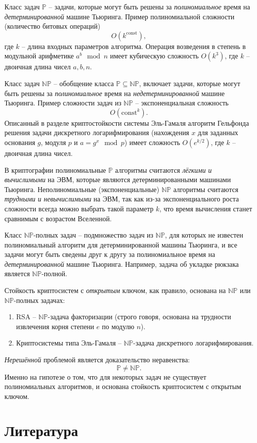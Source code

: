 \documentclass[10pt,a4paper,openany]{book}
\newcommand{\set}[1]{\mathbb{#1}}
\begin{document}
Класс задач $\set{P}$ -- задачи, которые могут быть решены за \emph{полиномиальное} время на \emph{детерминированной} машине Тьюринга. Пример полиномиальной сложности (количество битовых операций)
    \[ O(k^{\textrm{const}}), \]
где $k$ -- длина входных параметров алгоритма. Операция возведения в степень в модульной арифметике $a^b \mod n$ имеет кубическую сложность $O(k^3)$, где $k$ -- двоичная длина чисел $a,b,n$.

Класс задач $\set{NP}$ -- обобщение класса $\set{P} \subseteq \set{NP}$, включает задачи, которые могут быть решены за \emph{полиномиальное} время на \emph{недетерминированной} машине Тьюринга. Пример сложности задач из $\set{NP}$ -- экспоненциальная сложность
    \[ O(\textrm{const}^k). \]
Описанный в разделе криптостойкости системы Эль-Гамаля алгоритм Гельфонда решения задачи дискретного логарифмирования (нахождения $x$ для заданных основания $g$, модуля $p$ и $a = g^x \mod p$) имеет сложность $O(e^{k/2})$, где $k$ -- двоичная длина чисел.

В криптографии полиномиальные $\set{P}$ алгоритмы считаются \emph{лёгкими и вычислимыми} на ЭВМ, которые являются детерминированными машинами Тьюринга. Неполиномиальные (экспоненциальные) $\set{NP}$ алгоритмы считаются \emph{трудными и невычислимыми} на ЭВМ, так как из-за экспоненциального роста сложности всегда можно выбрать такой параметр $k$, что время вычисления станет сравнимым с возрастом Вселенной.


Класс $\set{NP}$-полных задач -- подмножество задач из $\set{NP}$, для которых не известен полиномиальный алгоритм для детерминированной машины Тьюринга, и все задачи могут быть сведены друг к другу за полиномиальное время на \emph{детерминированной} машине Тьюринга. Например, задача об укладке рюкзака является $\set{NP}$-полной.

Стойкость криптосистем с \emph{открытым} ключом, как правило, основана на $\set{NP}$ или $\set{NP}$-полных задачах:
\begin{enumerate}
    \item RSA -- $\set{NP}$-задача факторизации (строго говоря, основана на трудности извлечения корня степени $e$ по модулю $n$).
    \item Криптосистемы типа Эль-Гамаля -- $\set{NP}$-задача дискретного логарифмирования.
\end{enumerate}

\emph{Нерешённой} проблемой является доказательство неравенства:
    \[ \set{P} \neq \set{NP}. \]
Именно на гипотезе о том, что для некоторых задач не существует полиномиальных алгоритмов, и основана стойкость криптосистем с открытым ключом.





\printindex

\chapter*{Литература}
\begingroup
\renewcommand{\chapter}[2]{}%
%
%
\printbibliography
\endgroup
\end{document}
